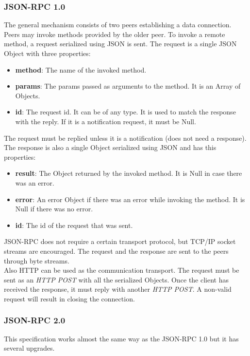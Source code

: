 \documentclass[a4paper, 12pt]{article} %
\begin{document}
        \subsubsection{JSON-RPC 1.0}
            The general mechanism consists of two peers establishing a data connection\cite{json-rpc-1}. Peers may invoke methods provided by the older peer. To invoke a remote method, a request serialized using JSON is sent. The request is a single JSON Object with three properties: 
            \begin{itemize}
                \item \textbf{method}: The name of the invoked method.
                \item \textbf{params}: The params passed as arguments to the method. It is an Array of Objects.
                \item \textbf{id}: The request id. It can be of any type. It is used to match the response with the reply. If it is a notification request, it must be Null.
            \end{itemize}
            The request must be replied unless it is a notification (does not need a response). The response is also a single Object serialized using JSON and has this properties:
            \begin{itemize}
                \item \textbf{result}: The Object returned by the invoked method. It is Null in case there was an error.
                \item \textbf{error}: An error Object if there was an error while invoking the method. It is Null if there was no error.
                \item \textbf{id}: The id of the request that was sent. 
            \end{itemize}
            JSON-RPC does not require a certain transport protocol, but TCP/IP socket streams are encouraged. The request and the response are sent to the peers through byte streams.\\

            Also HTTP can be used as the communication transport. The request must be sent as an \textit{HTTP POST} with all the serialized Objects. Once the client has received the response, it must reply with another \textit{HTTP POST}. A non-valid request will result in closing the connection.
        \subsubsection{JSON-RPC 2.0}
            This specification\cite{json-rpc-2} works almost the same way as the JSON-RPC 1.0 but it has several upgrades.\\
            
\end{document}
